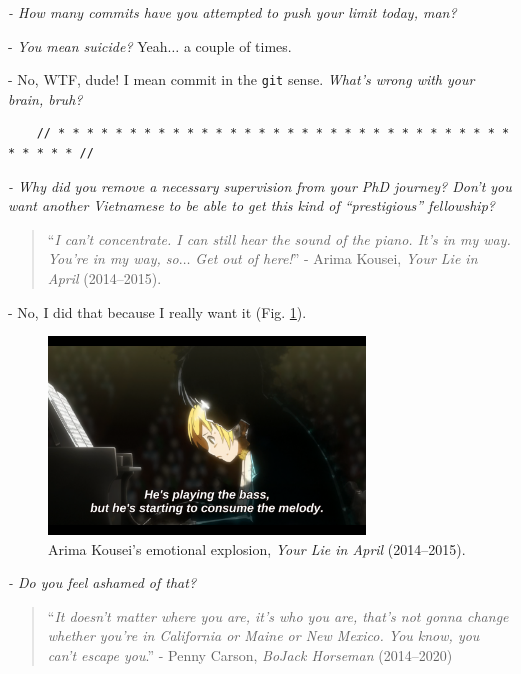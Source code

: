 \documentclass[12pt]{article}
\begin{document}
{\it - How many commits have you attempted to push your limit today, man?}

- {\it You mean suicide?} Yeah$\ldots$ a couple of times.

- No, WTF, dude! I mean commit in the \texttt{git} sense. {\it What's wrong with your brain, bruh?}

\begin{verbatim}
	// * * * * * * * * * * * * * * * * * * * * * * * * * * * * * * * * * * * * * //
\end{verbatim}

\noindent
{} {\it - Why did you remove a necessary supervision from your PhD journey? Don't you want another Vietnamese to be able to get this kind of ``prestigious'' fellowship?}

\begin{quotation}
	``{\it I can't concentrate. I can still hear the sound of the piano. It's in my way. You're in my way, so$\ldots$ Get out of here!}'' - Arima Kousei, {\it Your Lie in April}  (2014--2015).
\end{quotation}

- No, I did that because I really want it (Fig. \ref{fig4}).
\begin{figure}[h]
	\centering
	\includegraphics[width=0.75\textwidth]{Arima_Kousei_emotional_explosion}
	\caption{Arima Kousei's emotional explosion, {\it Your Lie in April} (2014--2015).}
	\label{fig4}
\end{figure}

{\it - Do you feel ashamed of that?}

\begin{quotation}
	``{\it It doesn't matter where you are, it's who you are, that's not gonna change whether you're in California or Maine or New Mexico. You know, you can't escape you}.'' - Penny Carson, {\it BoJack Horseman} (2014--2020)
\end{quotation}
\end{document}
